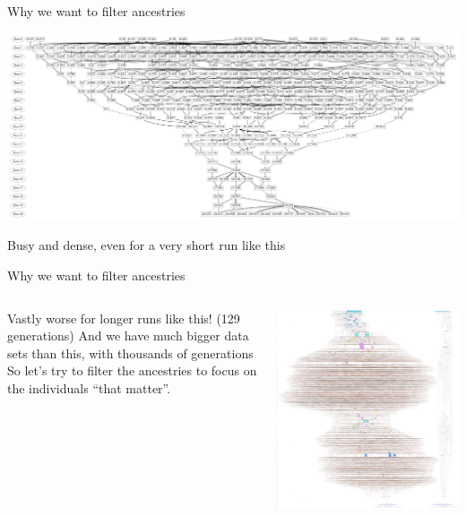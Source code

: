 \documentclass{beamer}
\newcommand{\linespace}{\vskip 0.25cm}
\begin{document}
\begin{frame}{Why we want to filter ancestries}
	\begin{center}
	\includegraphics[width=\linewidth]{../../figures/run0_GPTP_2_font_40}
	\end{center}
	\linespace
	Busy and dense, even for a very short run like this
\end{frame}

\begin{frame}{Why we want to filter ancestries}
	\begin{columns}
		\begin{column}{0.4 \linewidth}
			Vastly worse for longer runs like this! (129 generations)
			\linespace
			And we have much bigger data sets than this, with thousands of generations
			\linespace
			So let's try to filter the ancestries to focus on the individuals ``that matter''.
		\end{column}
		\begin{column}{0.6 \linewidth}
\begin{center}
	\includegraphics[height=0.8\textheight]{../../figures/run1_RBM_color_filtered_and_full_60000.png}
\end{center}
\end{column}			
	\end{columns}
\end{frame}
\end{document}

